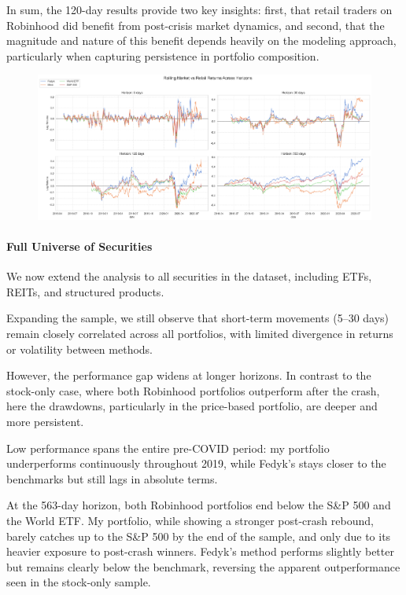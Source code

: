 In sum, the 120-day results provide two key insights: first, that retail traders on Robinhood did benefit from post-crisis market dynamics, and second, that the magnitude and nature of this benefit depends heavily on the modeling approach, particularly when capturing persistence in portfolio composition.

\begin{figure}[h!]
    \centering
    \includegraphics[width=1\linewidth]
    {../images/returns/comparison_1.png}
\end{figure}

\paragraph{Full Universe of Securities}

We now extend the analysis to all securities in the dataset, including ETFs, REITs, and structured products.

Expanding the sample, we still observe that short-term movements (5–30 days) remain closely correlated across all portfolios, with limited divergence in returns or volatility between methods.

However, the performance gap widens at longer horizons. 
In contrast to the stock-only case, where both Robinhood portfolios outperform after the crash, here the drawdowns, particularly in the price-based portfolio, are deeper and more persistent.

Low performance spans the entire pre-COVID period: my portfolio underperforms continuously throughout 2019, while Fedyk’s stays closer to the benchmarks but still lags in absolute terms.

At the 563-day horizon, both Robinhood portfolios end below the S\&P 500 and the World ETF.
My portfolio, while showing a stronger post-crash rebound, barely catches up to the S\&P 500 by the end of the sample, and only due to its heavier exposure to post-crash winners.
Fedyk’s method performs slightly better but remains clearly below the benchmark, reversing the apparent outperformance seen in the stock-only sample.

